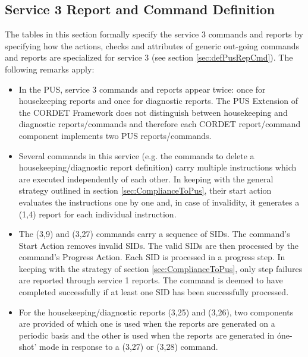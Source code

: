 \documentclass{pnp_article}
\begin{document}
\subsection{Service 3 Report and Command Definition}\label{sec:serv3RepCmdDef}
The tables in this section formally specify the service 3 commands and reports by specifying how the actions, checks and attributes of generic out-going commands and reports are specialized for service 3 (see section \ref{sec:defPusRepCmd}). The following remarks apply:

\begin{itemize}
\item In the PUS, service 3 commands and reports appear twice: once for housekeeping reports and once for diagnostic reports. The PUS Extension of the CORDET Framework does not distinguish between housekeeping and diagnostic reports/commands and therefore each CORDET report/command component implements two PUS reports/commands.
\item Several commands in this service (e.g. the commands to delete a housekeeping/diagnostic report definition) carry multiple instructions which are executed independently of each other. In keeping with the general strategy outlined in section \ref{sec:ComplianceToPus}, their start action evaluates the instructions one by one and, in case of invalidity, it generates a (1,4) report for each individual instruction.
\item The (3,9) and (3,27) commands carry a sequence of SIDs. The command's Start Action removes invalid SIDs. The valid SIDs are then processed by the command's Progress Action. Each SID is processed in a progress step. In keeping with the strategy of section \ref{sec:ComplianceToPus}, only step failures are reported through service 1 reports. The command is deemed to have completed successfully if at least one SID has been successfully processed. 
\item For the housekeeping/diagnostic reports (3,25) and (3,26), two components are provided of which one is used when the reports are generated on a periodic basis and the other is used when the reports are generated in óne-shot' mode in response to a (3,27) or (3,28) command.
\end{itemize}

\newpage
{}
\newpage
{}
\newpage
{}
\newpage
{}
\newpage
{}
\newpage
{}
\newpage
{}
\end{document}
